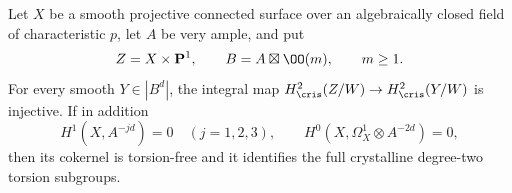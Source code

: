\begin{proposition}
\label{prop:OC-product-saturation-criterion}
Let $X$ be a smooth projective connected surface over an algebraically closed field of characteristic $p$, let $A$ be very ample, and put
\[
 Z=X\times\mathbf P^1,\qquad B=A\boxtimes\OO(m),\qquad m\geq1.
\]
For every smooth $Y\in|B^d|$, the integral map
$H^2_{\cris}(Z/W)\to H^2_{\cris}(Y/W)$ is injective.
If in addition
\begin{equation}\label{eq:OC-product-vanishing-hypotheses}
 H^1(X,A^{-jd})=0\quad(j=1,2,3),
 \qquad H^0(X,\Omega_X^1\otimes A^{-2d})=0,
\end{equation}
then its cokernel is torsion-free and it identifies the full crystalline degree-two torsion subgroups.
\end{proposition}
